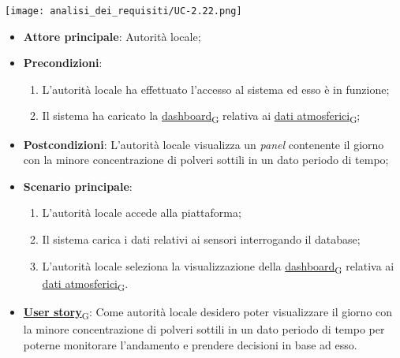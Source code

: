 \begin{center}
	\texttt{[image: analisi\_dei\_requisiti/UC-2.22.png]}
\end{center}

\begin{itemize}
	\item \textbf{Attore principale}: Autorità locale;
	\item \textbf{Precondizioni}:
	      \begin{enumerate}
		      \item L'autorità locale ha effettuato l'accesso al sistema ed esso è in funzione;
		      \item Il sistema ha caricato la \href{https://7last.github.io/docs/rtb/documentazione-interna/glossario\#dashboard}{dashboard\textsubscript{G}} relativa ai \href{https://7last.github.io/docs/rtb/documentazione-interna/glossario\#dati-atmosferici}{dati atmosferici\textsubscript{G}};
	      \end{enumerate}
	\item \textbf{Postcondizioni}: L'autorità locale visualizza un \textit{panel} contenente il giorno con la minore concentrazione di polveri sottili
	      in un dato periodo di tempo;
	\item \textbf{Scenario principale}:
	      \begin{enumerate}
		      \item L'autorità locale accede alla piattaforma;
		      \item Il sistema carica i dati relativi ai sensori interrogando il database;
		      \item L'autorità locale seleziona la visualizzazione della \href{https://7last.github.io/docs/rtb/documentazione-interna/glossario\#dashboard}{dashboard\textsubscript{G}} relativa ai \href{https://7last.github.io/docs/rtb/documentazione-interna/glossario\#dati-atmosferici}{dati atmosferici\textsubscript{G}}.
	      \end{enumerate}
	\item \href{https://7last.github.io/docs/rtb/documentazione-interna/glossario\#user-story}{\textbf{User story}\textsubscript{G}}: Come autorità locale desidero poter visualizzare il giorno con la minore concentrazione di polveri sottili
	      in un dato periodo di tempo per poterne monitorare l'andamento e prendere decisioni in base ad esso.
\end{itemize}


